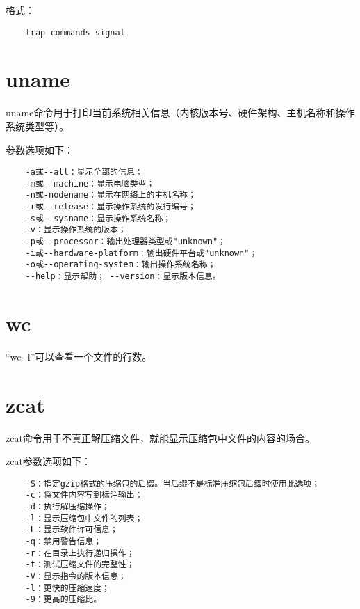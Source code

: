 \documentclass[a4paper,left=2.5cm,right=2.5cm,11pt]{article}
\begin{document}
	格式：
	\begin{lstlisting}
	trap commands signal
	\end{lstlisting}

\section{uname}
	uname命令用于打印当前系统相关信息（内核版本号、硬件架构、主机名称和操作系统类型等）。\par

	参数选项如下：
	\begin{lstlisting}
	-a或--all：显示全部的信息； 
	-m或--machine：显示电脑类型； 
	-n或-nodename：显示在网络上的主机名称； 
	-r或--release：显示操作系统的发行编号； 
	-s或--sysname：显示操作系统名称； 
	-v：显示操作系统的版本； 
	-p或--processor：输出处理器类型或"unknown"； 
	-i或--hardware-platform：输出硬件平台或"unknown"； 
	-o或--operating-system：输出操作系统名称； 
	--help：显示帮助； --version：显示版本信息。
	\end{lstlisting}

\section{wc}
	“wc -l”可以查看一个文件的行数。

\section{zcat}
	zcat命令用于不真正解压缩文件，就能显示压缩包中文件的内容的场合。\par

	zcat参数选项如下：
	\begin{lstlisting}
	-S：指定gzip格式的压缩包的后缀。当后缀不是标准压缩包后缀时使用此选项； 
	-c：将文件内容写到标注输出； 
	-d：执行解压缩操作； 
	-l：显示压缩包中文件的列表； 
	-L：显示软件许可信息； 
	-q：禁用警告信息； 
	-r：在目录上执行递归操作； 
	-t：测试压缩文件的完整性； 
	-V：显示指令的版本信息； 
	-l：更快的压缩速度； 
	-9：更高的压缩比。
	\end{lstlisting}
\end{document}
